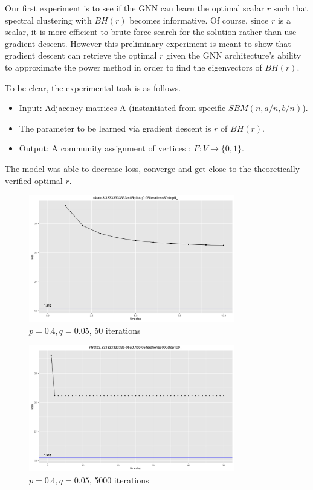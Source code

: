 Our first experiment is to see if the GNN can learn the optimal scalar $r$ such that spectral clustering with $BH(r)$ becomes informative. Of course, since $r$ is a scalar, it is more efficient to brute force search for the solution rather than use gradient descent. However this preliminary experiment is meant to show that gradient descent can retrieve the optimal $r$ given the GNN architecture's ability to approximate the power method in order to find the eigenvectors of $BH(r)$.  

To be clear, the experimental task is as follows.

\begin{itemize}
    \item Input: Adjacency matrices A (instantiated from specific $SBM(n,a/n, b/n)$). 
    \item The parameter to be learned via gradient descent is $r$ of $BH(r)$. 
    \item Output: A community assignment of vertices : $F : V \rightarrow \{0,1\}$. 
\end{itemize}

The model was able to decrease loss, converge and get close to the theoretically verified optimal $r$. 

\begin{figure}
\begin{center}
  \includegraphics[width=0.8\textwidth]{50steps.png}
   \caption{$p=0.4, q=0.05$, 50 iterations}
  \label{fig:GNN_BH}
 \end{center}
\end{figure}

\begin{figure}
\begin{center}
  \includegraphics[width=0.8\textwidth]{500steps.png}
   \caption{$p=0.4, q=0.05$, 5000 iterations}
  \label{fig:GNN_BH_1}
 \end{center}
\end{figure}


